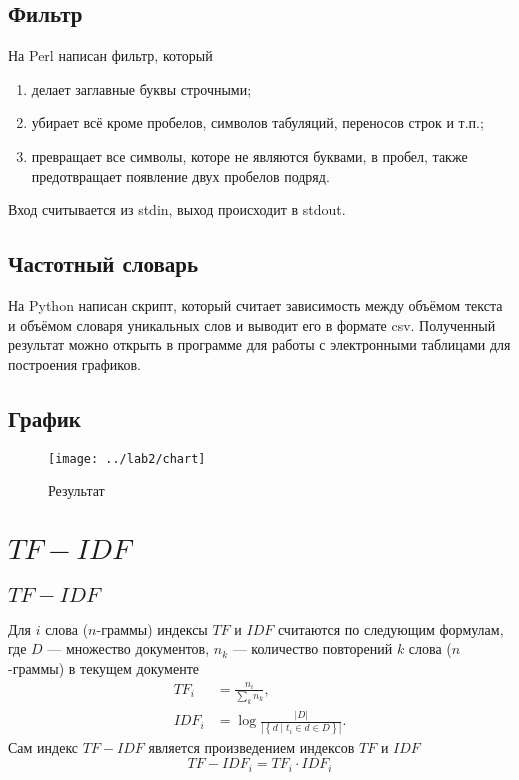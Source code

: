 \section{Фильтр}
На Perl написан фильтр, который
\begin{enumerate}
  \item делает заглавные буквы строчными;
  \item убирает всё кроме пробелов, символов табуляций, переносов строк и т.п.;
  \item превращает все символы, которе не являются буквами, в пробел, также
    предотвращает появление двух пробелов подряд.
\end{enumerate}

Вход считывается из stdin, выход происходит в stdout.

\lstset{inputencoding=utf8, extendedchars=\true}


\section{Частотный словарь}
На Python написан скрипт, который считает зависимость между объёмом текста
и объёмом словаря уникальных слов и выводит его в формате csv.
Полученный результат можно открыть в программе для работы
с электронными таблицами для построения графиков.

\lstset{inputencoding=utf8, extendedchars=\true}


\section{График}
\begin{figure}[h]
  \centering
  \texttt{[image: ../lab2/chart]}
  \caption{Результат}
\end{figure}

\chapter{$TF-IDF$}

\section{$TF-IDF$}
Для $i$ слова ($n$-граммы) индексы $TF$ и $IDF$ считаются
по следующим формулам, где
$D$ --- множество документов,
$n_k$ --- количество повторений $k$ слова ($n$-граммы) в текущем документе
\cite{Jones}
\begin{equation*}
  \begin{split}
    TF_i  &= \frac{n_i}{\sum_{k} n_k}, \\
    IDF_i &= \log {\frac{\left| D \right|}{
                   \left| \left\{ d \mid t_i \in d \in D \right\} \right|}}.
  \end{split}
\end{equation*}
Сам индекс $TF-IDF$ является произведением индексов $TF$ и $IDF$
\begin{equation*}
  TF-IDF_i = TF_i \cdot IDF_i
\end{equation*}

